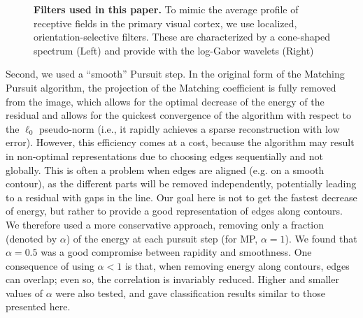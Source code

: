 \documentclass{article}
\begin{document}
\begin{figure}%
\caption{
{\bf Filters used in this paper.} To mimic the average profile of receptive fields in the primary visual cortex, we use localized, orientation-selective filters. These are characterized by a cone-shaped spectrum (Left) and provide with the log-Gabor wavelets (Right)
\label{fig:EUVIP_loggabor}}%
\end{figure}%

Second, we used a ``smooth'' Pursuit step.
In the original form of the Matching Pursuit algorithm,
the projection of the Matching coefficient is fully removed from the image,
which allows for the optimal decrease of the energy of the residual
and allows for the quickest convergence of the algorithm
with respect to the $\ell_0$ pseudo-norm
(i.e., it rapidly achieves a sparse reconstruction with low error).
However, this efficiency comes at a cost,
because the algorithm may result in non-optimal representations
due to choosing edges sequentially and not globally.
This is often a problem when edges are aligned (e.g. on a smooth contour),
as the different parts will be removed independently, potentially leading
to a residual with gaps in the line.
Our goal here is not to get the fastest decrease of energy,
but rather to provide a good representation of edges along contours.
We therefore used a more conservative approach,
removing only a fraction (denoted by $\alpha$)
of the energy at each pursuit step (for MP, $\alpha=1$).
We found that $\alpha=0.5$ was a good compromise between rapidity and smoothness.
One consequence of using $\alpha<1$ is that, when removing energy along contours,
edges can overlap; even so, the correlation is invariably reduced.
Higher and smaller values of $\alpha$ were also tested,
and gave classification results similar to those presented here.
\end{document}
